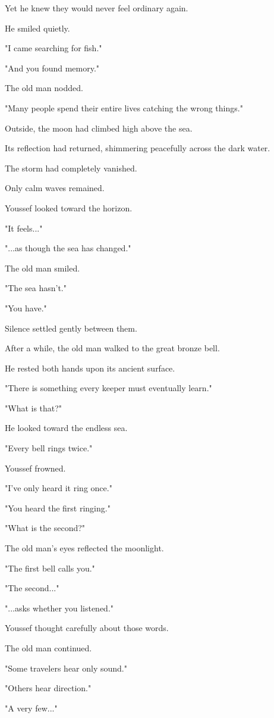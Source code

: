 \documentclass[12pt,openany]{book}
\begin{document}
Yet he knew they would never feel ordinary again.

He smiled quietly.

"I came searching for fish."

"And you found memory."

The old man nodded.

"Many people spend their entire lives catching the wrong things."

Outside, the moon had climbed high above the sea.

Its reflection had returned, shimmering peacefully across the dark water.

The storm had completely vanished.

Only calm waves remained.

Youssef looked toward the horizon.

"It feels..."

"...as though the sea has changed."

The old man smiled.

"The sea hasn't."

"You have."

Silence settled gently between them.

After a while, the old man walked to the great bronze bell.

He rested both hands upon its ancient surface.

"There is something every keeper must eventually learn."

"What is that?"

He looked toward the endless sea.

"Every bell rings twice."

Youssef frowned.

"I've only heard it ring once."

"You heard the first ringing."

"What is the second?"

The old man's eyes reflected the moonlight.

"The first bell calls you."

"The second..."

"...asks whether you listened."

Youssef thought carefully about those words.

The old man continued.

"Some travelers hear only sound."

"Others hear direction."

"A very few..."
\end{document}
